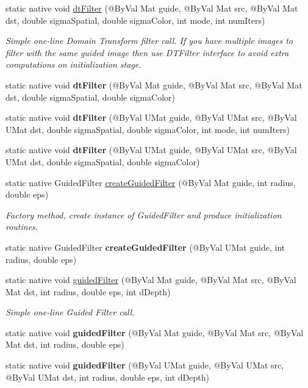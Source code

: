 \begin{DoxyCompactItemize}
\item 
static native void \hyperlink{group__ximgproc__filters_ga7a3f493e82d0571f6a8ed61d005542d9}{dt\+Filter} (@By\+Val Mat guide, @By\+Val Mat src, @By\+Val Mat dst, double sigma\+Spatial, double sigma\+Color, int mode, int num\+Iters)
\begin{DoxyCompactList}\small\item\em Simple one-\/line Domain Transform filter call. If you have multiple images to filter with the same guided image then use D\+T\+Filter interface to avoid extra computations on initialization stage. \end{DoxyCompactList}\item 
static native void {\bfseries dt\+Filter} (@By\+Val Mat guide, @By\+Val Mat src, @By\+Val Mat dst, double sigma\+Spatial, double sigma\+Color)
\item 
static native void {\bfseries dt\+Filter} (@By\+Val U\+Mat guide, @By\+Val U\+Mat src, @By\+Val U\+Mat dst, double sigma\+Spatial, double sigma\+Color, int mode, int num\+Iters)
\item 
static native void {\bfseries dt\+Filter} (@By\+Val U\+Mat guide, @By\+Val U\+Mat src, @By\+Val U\+Mat dst, double sigma\+Spatial, double sigma\+Color)
\item 
static native Guided\+Filter \hyperlink{group__ximgproc__filters_gaa4f34319223da44cce2ad4e75b776287}{create\+Guided\+Filter} (@By\+Val Mat guide, int radius, double eps)
\begin{DoxyCompactList}\small\item\em Factory method, create instance of Guided\+Filter and produce initialization routines. \end{DoxyCompactList}\item 
static native Guided\+Filter {\bfseries create\+Guided\+Filter} (@By\+Val U\+Mat guide, int radius, double eps)
\item 
static native void \hyperlink{group__ximgproc__filters_ga7a63d78fbc962c2c9df0f525ae8083ff}{guided\+Filter} (@By\+Val Mat guide, @By\+Val Mat src, @By\+Val Mat dst, int radius, double eps, int d\+Depth)
\begin{DoxyCompactList}\small\item\em Simple one-\/line Guided Filter call. \end{DoxyCompactList}\item 
static native void {\bfseries guided\+Filter} (@By\+Val Mat guide, @By\+Val Mat src, @By\+Val Mat dst, int radius, double eps)
\item 
static native void {\bfseries guided\+Filter} (@By\+Val U\+Mat guide, @By\+Val U\+Mat src, @By\+Val U\+Mat dst, int radius, double eps, int d\+Depth)

\end{DoxyCompactItemize}
